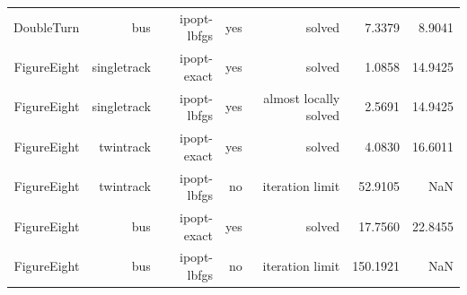 {\begin{longtable}{|r|r|r|r|r|r|r|}
  DoubleTurn & bus & ipopt-lbfgs & yes & solved & 7.3379 & 8.9041 \\
  FigureEight & singletrack & ipopt-exact & yes & solved & 1.0858 & 14.9425 \\
  FigureEight & singletrack & ipopt-lbfgs & yes & almost locally solved & 2.5691 & 14.9425 \\
  FigureEight & twintrack & ipopt-exact & yes & solved & 4.0830 & 16.6011 \\
  FigureEight & twintrack & ipopt-lbfgs & no & iteration limit & 52.9105 & NaN \\
  FigureEight & bus & ipopt-exact & yes & solved & 17.7560 & 22.8455 \\
  FigureEight & bus & ipopt-lbfgs & no & iteration limit & 150.1921 & NaN \\
  \hline
\end{longtable}
}
